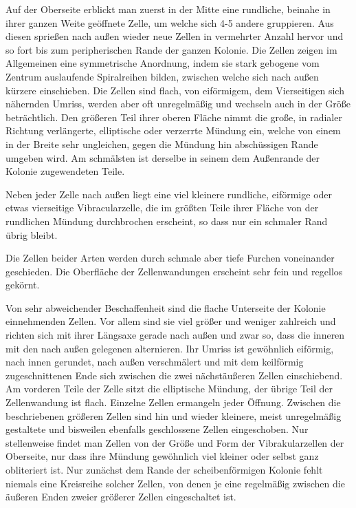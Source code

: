 \documentclass[a4paper, 11pt, oneside, german]{article}
\begin{document}
Auf der Oberseite erblickt man zuerst in der Mitte eine rundliche, beinahe in ihrer ganzen Weite geöffnete Zelle, um welche sich 4-5 andere gruppieren. Aus diesen sprießen nach außen wieder neue Zellen in vermehrter Anzahl hervor und so fort bis zum peripherischen Rande der ganzen Kolonie. Die Zellen zeigen im Allgemeinen eine symmetrische Anordnung, indem sie stark gebogene vom Zentrum auslaufende Spiralreihen bilden, zwischen welche sich nach außen kürzere einschieben. Die Zellen sind flach, von eiförmigem, dem Vierseitigen sich nähernden Umriss, werden aber oft unregelmäßig und wechseln auch in der Größe beträchtlich. Den größeren Teil ihrer oberen Fläche nimmt die große, in radialer Richtung verlängerte, elliptische oder verzerrte Mündung ein, welche von einem in der Breite sehr ungleichen, gegen die Mündung hin abschüssigen Rande umgeben wird. Am schmälsten ist derselbe in seinem dem Außenrande der Kolonie zugewendeten Teile.

Neben jeder Zelle nach außen liegt eine viel kleinere rundliche, eiförmige oder etwas vierseitige Vibracularzelle, die im größten Teile ihrer Fläche von der rundlichen Mündung durchbrochen erscheint, so dass nur ein schmaler Rand übrig bleibt.

Die Zellen beider Arten werden durch schmale aber tiefe Furchen voneinander geschieden. Die Oberfläche der Zellenwandungen erscheint sehr fein und regellos gekörnt.

Von sehr abweichender Beschaffenheit sind die flache Unterseite der Kolonie einnehmenden Zellen. Vor allem sind sie viel größer und weniger zahlreich und richten sich mit ihrer Längsaxe gerade nach außen und zwar so, dass die inneren mit den nach außen gelegenen alternieren. Ihr Umriss ist gewöhnlich eiförmig, nach innen gerundet, nach außen verschmälert und mit dem keilförmig zugeschnittenen Ende sich zwischen die zwei nächstäußeren Zellen einschiebend. Am vorderen Teile der Zelle sitzt die elliptische Mündung, der übrige Teil der Zellenwandung ist flach. Einzelne Zellen ermangeln jeder Öffnung. Zwischen die beschriebenen größeren Zellen sind hin und wieder kleinere, meist unregelmäßig gestaltete und bisweilen ebenfalls geschlossene Zellen eingeschoben. Nur stellenweise findet man Zellen von der Größe und Form der Vibrakularzellen der Oberseite, nur dass ihre Mündung gewöhnlich viel kleiner oder selbst ganz obliteriert ist. Nur zunächst dem Rande der scheibenförmigen Kolonie fehlt niemals eine Kreisreihe solcher Zellen, von denen je eine regelmäßig zwischen die äußeren Enden zweier größerer Zellen eingeschaltet ist.
\end{document}
